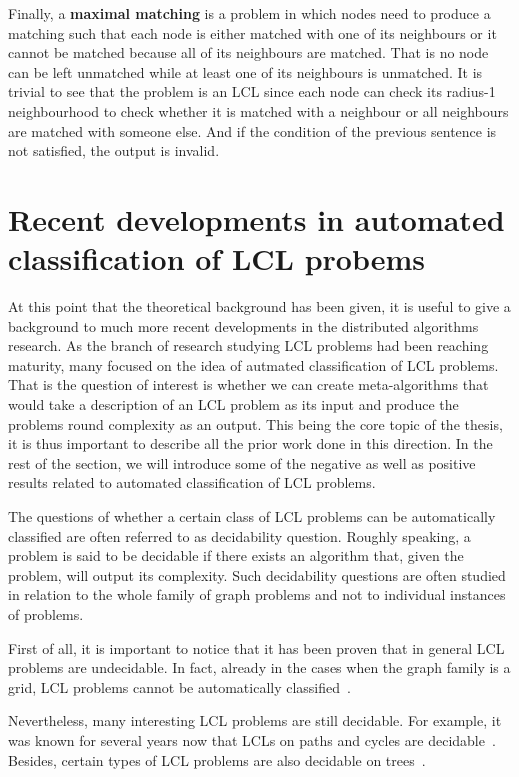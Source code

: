 Finally, a \textbf{maximal matching} is a problem in which nodes need to
produce a matching such that each node is either matched with one of 
its neighbours or it cannot be matched because all of its neighbours are
matched. That is no node can be left unmatched while at least one of its
neighbours is unmatched. It is trivial to see that the problem is an LCL
since each node can check its radius-1 neighbourhood to check whether it
is matched with a neighbour or all neighbours are matched with someone else.
And if the condition of the previous sentence is not satisfied, the output
is invalid.

\section{Recent developments in automated classification of LCL probems}

At this point that the theoretical background has been given, it is
useful to give a background to much more recent developments in the
distributed algorithms research. As the branch of research
studying LCL problems had been reaching maturity, many focused
on the idea of autmated classification of LCL problems. That is
the question of interest is whether we can create meta-algorithms
that would take a description of an LCL problem as its input
and produce the problems round complexity as an output.
This being the core topic of the thesis, it is thus important
to describe all the prior work done in this direction.
In the rest of the
section, we will introduce some of the negative as well as positive results
related to automated classification of LCL problems.

The questions of whether a certain class of LCL problems
can be automatically classified are often referred to
as decidability question. Roughly speaking, a problem is
said to be decidable if there exists an algorithm that,
given the problem, will output its complexity. Such decidability
questions are often studied in relation to the whole
family of graph problems and not to individual instances
of problems.

First of all, it is important to notice that it has been
proven that in general LCL problems are undecidable.
In fact, already in the cases when the graph family is a grid,
LCL problems cannot be automatically classified~\cite{Brandt2017, Naor1993}.

Nevertheless, many interesting LCL problems are still decidable.
For example, it was known for several years now that LCLs
on paths and cycles are decidable~\cite{Balliu2018, Brandt2017, Naor1993}.
Besides, certain types of LCL problems are also decidable on
trees~\cite{Chang2017}.

